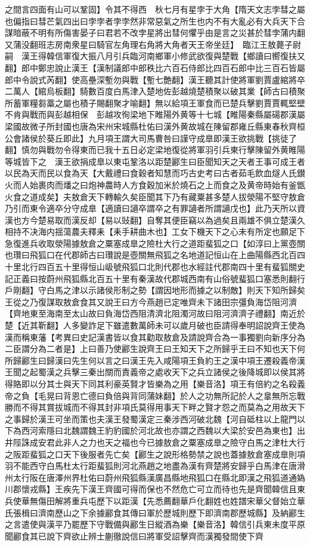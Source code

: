 之間言四面有山可以鞏固】令其不得西　秋七月有星孛于大角【隋天文志孛彗之屬也偏指曰彗芒氣四出曰孛孛者孛孛然非常惡氣之所生也内不有大亂必有大兵天下合謀暗蔽不明有所傷害晏子曰君若不改孛星將出彗何懼乎由是言之災甚於彗孛蒲内翻又蒲没翻班志房南衆星曰騎官左角理右角將大角者天王帝坐廷】　臨江王敖薨子尉嗣　漢王得韓信軍復大振八月引兵臨河南鄉軍小修武欲復與楚戰【鄉讀曰嚮復扶又翻】郎中鄭忠說止漢王【漢制議郎中郎秩比六百石侍郎比四百石郎中比三百石皆屬郎中令說式芮翻】使高壘深塹勿與戰【塹七艶翻】漢王聽其計使將軍劉賈盧綰將卒二萬人【綰烏板翻】騎數百度白馬津入楚地佐彭越燒楚積聚以破其業【師古曰積聚所蓄軍糧芻藁之屬也積子賜翻聚才喻翻】無以給項王軍食而已楚兵擊劉賈賈輒堅壁不肯與戰而與彭越相保　彭越攻徇梁地下睢陽外黄等十七城【睢陽秦縣屬碭郡漢屬梁國故微子所封國也唐為宋州宋城縣杜佑曰漢外黄故城在陳留郡雍丘縣東春秋齊桓公會諸侯於葵丘即此】九月項王謂大司馬曹咎曰謹守成臯即漢王欲挑戰【挑徒了翻】慎勿與戰勿令得東而已我十五日必定梁地復從將軍羽引兵東行擊陳留外黄睢陽等城皆下之　漢王欲捐成臯以東屯鞏洛以距楚酈生曰臣聞知天之天者王事可成王者以民為天而民以食為天【大戴禮曰食穀者知慧而巧古史考曰古者茹毛飲血燧人氏鑚火而人始裹肉而燔之曰炮神農時人方食穀加米於燒石之上而食之及黄帝時始有釜甑火食之道成矣】夫敖倉天下轉輸久矣臣聞其下乃有藏粟甚多楚人拔滎陽不堅守敖倉乃引而東令適卒分守成臯【適讀曰讁卒謂卒之有罪讁者所謂讁戊也】此乃天所以資漢也方今楚易取而漢反却【易以䜴翻】自奪其便臣竊以為過矣且兩雄不俱立楚漢久相持不决海内揺蕩農夫釋耒【耒手耕曲木也】工女下機天下之心未有所定也願足下急復進兵收取滎陽據敖倉之粟塞成臯之險杜大行之道距蜚狐之口【如淳曰上黨壺關也瓚曰飛狐口在代郡師古曰瓚說是壺關無飛狐之名地道記恒山在上曲陽縣西北百四十里北行四百五十里得恒山岋號飛狐口北則代郡也水經註代郡南四十里有蜚狐關史記正義曰按蔚州飛狐縣北百五十里有秦漢故代郡城西南有山俗號蜚狐口塞悉則翻行戶剛翻】守白馬之津以示諸侯形制之勢【謂因地形而據之以制敵】則天下知所歸矣王從之乃復謀取敖倉食其又說王曰方今燕趙已定唯齊未下諸田宗彊負海岱阻河濟【齊地東至海南至太山故曰負海岱西阻清濟北阻濁河故曰阻河濟濟子禮翻】南近於楚【近其靳翻】人多變詐足下雖遣數萬師未可以歲月破也臣請得奉明詔說齊王使為漢而稱東藩【考異曰史記漢書皆以食其勸取敖倉及請說齊合為一事獨劉向新序分為二臣謂分為二者是】上曰善乃使酈生說齊王曰王知天下之所歸乎王曰不知也天下何所歸酈生曰歸漢曰先生何以言之曰漢王先入咸陽項王負約王之漢中項王遷殺義帝漢王聞之起蜀漢之兵擊三秦出關而責義帝之處收天下之兵立諸侯之後降城即以侯其將得賂即以分其士與天下同其利豪英賢才皆樂為之用【樂音洛】項王有倍約之名殺義帝之負【毛晃曰背恩亡德曰負倍與背同蒲妹翻】於人之功無所記於人之辠無所忘戰勝而不得其賞拔城而不得其封非項氏莫得用事天下畔之賢才怨之而莫為之用故天下之事歸於漢王可坐而策也夫漢王發蜀漢定三秦涉西河破北魏【河自砥柱以上龍門以下為西河索隱曰北魏謂魏王豹豹國於河北故也亦謂之西魏以大梁於安邑為東也】出井陘誅成安君此非人之力也天之福也今已據敖倉之粟塞成臯之險守白馬之津杜大行之阪距蜚狐之口天下後服者先亡矣【酈生之說形格勢禁之說也蓋據敖倉塞成臯則項羽不能西守白馬杜太行距蜚狐則河北燕趙之地盡為漢有齊楚將安歸乎白馬津在唐滑州太行阪在唐澤州界杜佑曰蔚州飛狐縣漢廣昌縣地飛狐口在縣北即漢之飛狐道通媯川郡懷戎縣】王疾先下漢王齊國可得而保也不然危亡可立而待也先是齊聞韓信且東兵使華無傷田解將重兵屯歷下以距漢【先悉薦翻華戶化翻姓也姓譜宋華父督始立華氏張楫曰濟南歷山之下余據酈食其傳曰軍於歷城則歷下即濟南郡歷城縣】及納酈生之言遣使與漢平乃罷歷下守戰備與酈生日縱酒為樂【樂音洛】韓信引兵東未度平原聞酈食其已說下齊欲止辨士蒯徹說信曰將軍受詔擊齊而漢獨發間使下齊